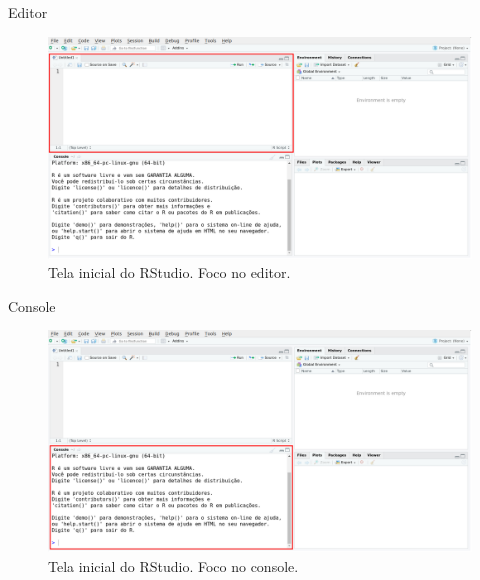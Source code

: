 \documentclass[
  ignorenonframetext,
  serif,
  professionalfont,
  usenames,
  dvipsnames,
  aspectratio = 169]{beamer}
\begin{document}
\begin{frame}{Editor}
\protect\hypertarget{editor}{}
\begin{figure}

{\centering \includegraphics[width=0.85\linewidth]{./img/editor} 

}

\caption{Tela inicial do RStudio. Foco no editor.}\label{fig:unnamed-chunk-5}
\end{figure}
\end{frame}

\begin{frame}{Console}
\protect\hypertarget{console}{}
\begin{figure}

{\centering \includegraphics[width=0.85\linewidth]{./img/console} 

}

\caption{Tela inicial do RStudio. Foco no console.}\label{fig:unnamed-chunk-6}
\end{figure}
\end{frame}
\end{document}
